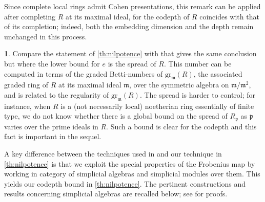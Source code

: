 \documentclass{amsart}
\newcommand{\fm}{\mathfrak{m}}
\newcommand{\fp}{\mathfrak{p}}
\theoremstyle{definition}
\newtheorem{chunk}[subsection]{}
\theoremstyle{remark}
\numberwithin{equation}{subsection}
\begin{document}
Since complete local rings admit Cohen presentations, this remark can be applied after completing $R$ at its maximal ideal, for the codepth of $R$ coincides with that of its completion; indeed, both the embedding dimension and the depth remain unchanged in this process.

\begin{chunk}
\label{ch:AIM}
Compare the statement of \cref{th:nilpotence} with \cite[Theorem~6.2.2]{Avramov/Iyengar/Miller:2006} that gives the same conclusion but where the lower bound for $e$ is the spread of $R$. This number can be computed in terms of the graded Betti-numbers of $\mathrm{gr}_{\fm}(R)$, the associated graded ring of $R$ at its maximal ideal $\fm$, over the symmetric algebra on $\fm/\fm^2$, and is related to the regularity of $\mathrm{gr}_{\fm}(R)$. The spread is harder to control; for instance, when $R$ is a (not necessarily local) noetherian ring essentially of finite type, we do not know whether there is a global bound on the spread of $R_\fp$ as $\fp$ varies over the prime ideals in $R$. Such a bound is clear for the codepth and this fact is important in the sequel.

A key difference between the techniques used in \cite[Theorem~6.2.2]{Avramov/Iyengar/Miller:2006} and our technique in \cref{th:nilpotence} is that we exploit the special properties of the Frobenius map by working in category of simplicial algebras and simplicial modules over them. This yields our codepth bound in \cref{th:nilpotence}. The pertinent constructions and results concerning simplicial algebras are recalled below; see \cite{Quillen:1967,Schwede/Shipley:2003} for proofs.
\end{chunk}
\end{document}
